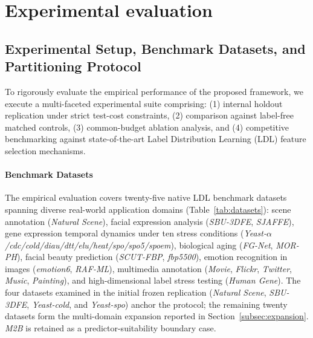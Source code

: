 \section{Experimental evaluation}
\label{sec:paper-experiments}
\subsection{Experimental Setup, Benchmark Datasets, and Partitioning Protocol}
\label{subsec:exp-setup}

To rigorously evaluate the empirical performance of the proposed framework, we execute a multi-faceted experimental suite comprising: (1) internal holdout replication under strict test-cost constraints, (2) comparison against label-free matched controls, (3) common-budget ablation analysis, and (4) competitive benchmarking against state-of-the-art Label Distribution Learning (LDL) feature selection mechanisms.

\paragraph{Benchmark Datasets}
The empirical evaluation covers twenty-five native LDL benchmark datasets spanning diverse real-world application domains (Table~\ref{tab:datasets}): scene annotation (\textit{Natural Scene}), facial expression analysis (\textit{SBU-3DFE}, \textit{SJAFFE}), gene expression temporal dynamics under ten stress conditions (\textit{Yeast-$\alpha$/cdc/cold/diau/dtt/elu/heat/spo/spo5/spoem}), biological aging (\textit{FG-Net}, \textit{MOR-PH}), facial beauty prediction (\textit{SCUT-FBP}, \textit{fbp5500}), emotion recognition in images (\textit{emotion6}, \textit{RAF-ML}), multimedia annotation (\textit{Movie}, \textit{Flickr}, \textit{Twitter}, \textit{Music}, \textit{Painting}), and high-dimensional label stress testing (\textit{Human Gene}). The four datasets examined in the initial frozen replication (\textit{Natural Scene}, \textit{SBU-3DFE}, \textit{Yeast-cold}, and \textit{Yeast-spo}) anchor the protocol; the remaining twenty datasets form the multi-domain expansion reported in Section~\ref{subsec:expansion}. \textit{M2B} is retained as a predictor-suitability boundary case.



